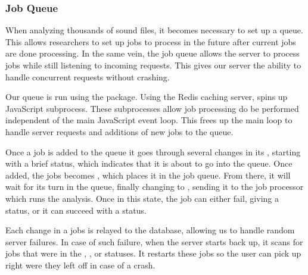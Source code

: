 \subsubsection{Job Queue}
When analyzing thousands of sound files, it becomes necessary to set up a queue. This allows researchers to set up jobs to process in the future after current jobs are done processing. In the same vein, the job queue allows the server to process jobs while still listening to incoming requests. This gives our server the ability to handle concurrent requests without crashing.\par 
Our queue is run using the  package. Using the Redis caching server,  spins up JavaScript subprocess. These subprocesses allow job processing do be performed independent of the main JavaScript event loop. This frees up the main loop to handle server requests and additions of new jobs to the queue.\par
Once a job is added to the queue it goes through several changes in its , starting with a brief  status, which indicates that it is about to go into the queue. Once added, the job\textquotesingle s  becomes , which places it in the job queue. From there, it will wait for its turn in the queue, finally changing to , sending it to the job processor which runs the analysis. Once in this state, the job can either fail, giving a  status, or it can succeed with a  status.\par
Each change in a job\textquotesingle s  is relayed to the database, allowing us to handle random server failures. In case of such failure, when the server starts back up, it scans for jobs that were in the , , or  statuses. It restarts these jobs so the user can pick up right were they left off in case of a crash.